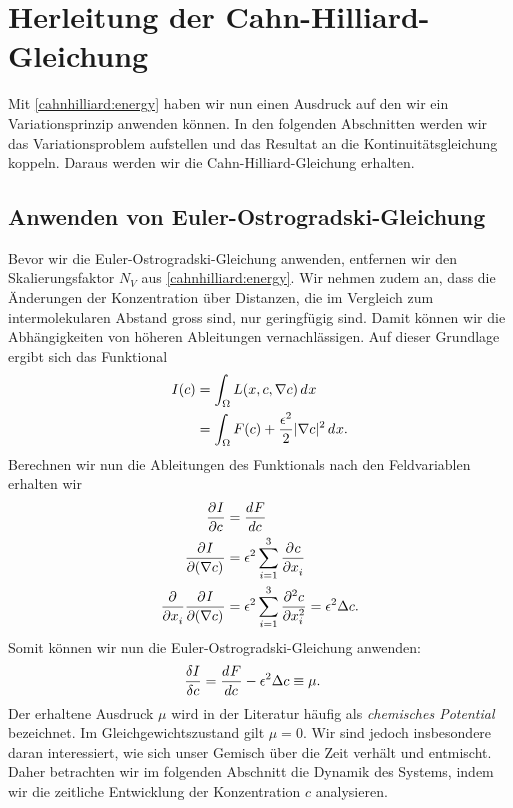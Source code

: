 %
%
%
%
\section{Herleitung der Cahn-Hilliard-Gleichung\label{cahnhilliard:section:herleitung}}
Mit \eqref{cahnhilliard:energy} haben wir nun einen Ausdruck auf den wir ein Variationsprinzip anwenden können.
In den folgenden Abschnitten werden wir das Variationsproblem aufstellen und
das Resultat an die Kontinuitätsgleichung koppeln.
Daraus werden wir die Cahn-Hilliard-Gleichung erhalten.

\subsection{Anwenden von Euler-Ostrogradski-Gleichung}
Bevor wir die Euler-Ostrogradski-Gleichung anwenden,
entfernen wir den Skalierungsfaktor $N_V$ aus \eqref{cahnhilliard:energy}.
Wir nehmen zudem an,
dass die Änderungen der Konzentration über Distanzen,
die im Vergleich zum intermolekularen Abstand gross sind,
nur geringfügig sind.
Damit können wir die Abhängigkeiten von höheren Ableitungen vernachlässigen.
Auf dieser Grundlage ergibt sich das Funktional
\begin{align}
I(c)
&=
\int_\Omega L(x, c, \nabla c) \di{x}
\nonumber
\\
&=
\int_\Omega F(c) + \frac{\epsilon^2}{2} |\nabla c|^2 \di{x}.
\end{align}
Berechnen wir nun die Ableitungen des Funktionals nach den Feldvariablen erhalten wir
\begin{align*}
\pderiv{I}{c}
&=
\deriv{F}{c}
\\
\pderiv{I}{(\nabla c)}
&=
\epsilon^2 \sum_{i=1}^3 \pderiv{c}{x_i}
\\
\pderiv{}{x_i}\pderiv{I}{(\nabla c)}
&=
\epsilon^2 \sum_{i=1}^3 \pderiv[2]{c}{x_i}
=
\epsilon^2 \Delta c
.
\end{align*}
Somit können wir nun die Euler-Ostrogradski-Gleichung anwenden:
\begin{align*}
\frac{\delta I}{\delta c}
&=
\deriv{F}{c} -  \epsilon^2 \Delta c
\equiv
\mu
.
\end{align*}
Der erhaltene Ausdruck $\mu$ wird in der Literatur häufig als
\emph{chemisches Potential} bezeichnet.
Im Gleichgewichtszustand gilt $\mu = 0$.
Wir sind jedoch insbesondere daran interessiert,
wie sich unser Gemisch über die Zeit verhält und entmischt.
Daher betrachten wir im folgenden Abschnitt die Dynamik des Systems,
indem wir die zeitliche Entwicklung der Konzentration
$c$ analysieren.

